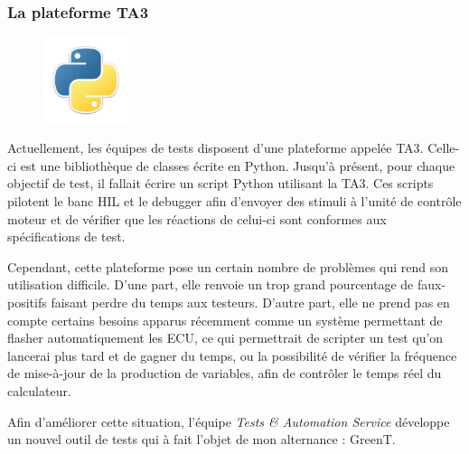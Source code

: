 \subsubsection{La plateforme TA3}\label{ta3}
\begin{figure}
	\includegraphics[width=2.5cm]{contents/images/python.png}
\end{figure}
Actuellement, les équipes de tests disposent d'une plateforme appelée TA3. Celle-ci est une bibliothèque de classes écrite en Python. Jusqu'à présent, pour chaque objectif de test, il fallait écrire un script Python utilisant la TA3. Ces scripts pilotent le banc HIL et le debugger afin d'envoyer des stimuli à l'unité de contrôle moteur et de vérifier que les réactions de celui-ci sont conformes aux spécifications de test.

Cependant, cette plateforme pose un certain nombre de problèmes qui rend son utilisation difficile. D'une part, elle renvoie un trop grand pourcentage de faux-positifs faisant perdre du temps aux testeurs. D'autre part, elle ne prend pas en compte certains besoins apparus récemment comme un système permettant de flasher automatiquement les ECU, ce qui permettrait de scripter un test qu'on lancerai plus tard et de gagner du temps, ou la possibilité de vérifier la fréquence de mise-à-jour de la production de variables, afin de contrôler le temps réel du calculateur.

 
Afin d'améliorer cette situation, l'équipe \textit{Tests \& Automation Service} développe un nouvel outil de tests qui à fait l'objet de mon alternance : GreenT.

